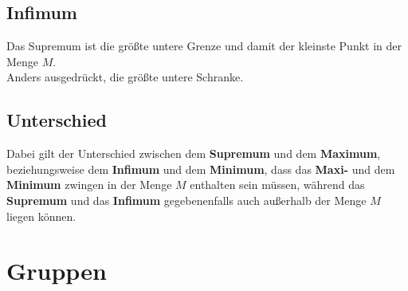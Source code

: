 \documentclass[11pt]{article}
\begin{document}
    \subsection{Infimum}\label{subsec:infimum}
    Das Supremum ist die größte untere Grenze und damit der kleinste Punkt in der Menge $M$.\\
    Anders ausgedrückt, die größte untere Schranke.

    \subsection{Unterschied}\label{subsec:unterschied}
    Dabei gilt der Unterschied zwischen dem \textbf{Supremum} und dem \textbf{Maximum}, beziehungsweise dem \textbf{Infimum} und dem \textbf{Minimum}, dass
    das \textbf{Maxi-} und dem \textbf{Minimum} zwingen in der Menge $M$ enthalten sein müssen, während das \textbf{Supremum} und das \textbf{Infimum} gegebenenfalls auch außerhalb der Menge $M$ liegen können.

    \section{Gruppen}\label{sec:gruppen}
    
\end{document}
